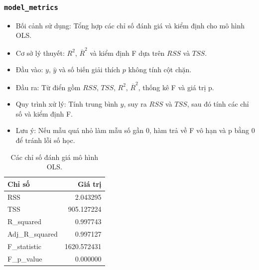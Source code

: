 \documentclass[a4paper]{article}
\newcommand{\code}[1]{\colorbox{light-gray}{\texttt{#1}}}
\begin{document}
\subsubsection{\code{model\_metrics}}
\begin{itemize}[leftmargin=*]
    \item Bối cảnh sử dụng: Tổng hợp các chỉ số đánh giá và kiểm định cho mô hình OLS.
    \item Cơ sở lý thuyết: $R^2$, $\overline{R}^2$ và kiểm định F dựa trên $RSS$ và $TSS$.
    \item Đầu vào: $y$, $\hat{y}$ và số biến giải thích $p$ không tính cột chặn.
    \item Đầu ra: Từ điển gồm $RSS$, $TSS$, $R^2$, $\overline{R}^2$, thống kê F và giá trị p.
    \item Quy trình xử lý: Tính trung bình $y$, suy ra $RSS$ và $TSS$, sau đó tính các chỉ số và kiểm định F.
    \item Lưu ý: Nếu mẫu quá nhỏ làm mẫu số gần 0, hàm trả về F vô hạn và p bằng 0 để tránh lỗi số học.
\end{itemize}
\begin{table}[H]
    \centering
    \small
    \begin{tabular}{lr}
    \toprule
    \textbf{Chỉ số} & \textbf{Giá trị} \\
    \midrule
    RSS & 2.043295 \\
    TSS & 905.127224 \\
    R\_squared & 0.997743 \\
    Adj\_R\_squared & 0.997127 \\
    F\_statistic & 1620.572431 \\
    F\_p\_value & 0.000000 \\
    \bottomrule
    \end{tabular}
    \caption{Các chỉ số đánh giá mô hình OLS.}
\end{table}
\end{document}
